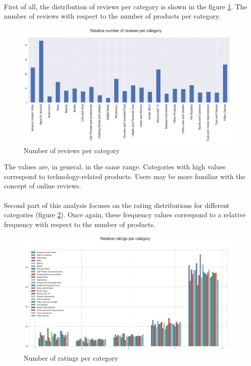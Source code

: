 \documentclass[11pt]{article}
\begin{document}
\paragraph{}
First of all, the distribution of reviews per category is shown in the figure \ref{reviews}. The number of reviews with respect to the number of products per category.

\begin{figure}[!h]
\centering
\includegraphics[width=1\linewidth]{reviews.png}
\caption{Number of reviews per category}
\label{reviews}
\end{figure}

The values are, in general, in the same range. Categories with high values correspond to technology-related products. Users may be more familiar with the concept of online reviews.

\paragraph{}
Second part of this analysis focuses on the rating distributions for different categories (figure \ref{ratings}). Once again, these frequency values correspond to a relative frequency with respect to the number of products.

\begin{figure}[!h]
\centering
\includegraphics[width=1\linewidth]{ratings.png}
\caption{Number of ratings per category}
\label{ratings}
\end{figure}
\end{document}

